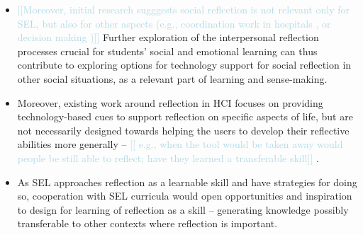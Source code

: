 \documentclass[prodmode,acmtochi]{acmsmall}
\newcommand{\todo}[1]{\textrm{\textrm{\textcolor{LightBlue}{[[#1]]} } } }
\begin{document}
\begin{itemize}
\item \todo{Moreover, initial research sugggests social reflection is not relevant only for SEL, but also for other aspects (e.g., coordination work in hospitals \cite{Prilla}, or decision making \cite{Dey})} Further exploration of the interpersonal reflection processes crucial for students' social and emotional learning can thus contribute to exploring options for technology support for social reflection in other social situations, as a relevant part of learning and sense-making.
\bigskip

\item Moreover, existing work around reflection in HCI focuses on providing technology-based cues to support reflection on specific aspects of life, but are not necessarily designed towards helping the users to develop their reflective abilities more generally -- \todo{ e.g., when the tool would be taken away would people be still able to reflect; have they learned a transferable skill}. 

\item As SEL approaches reflection as a learnable skill and have strategies for doing so, cooperation with SEL curricula would open opportunities and inspiration to design for learning of reflection as a skill -- generating knowledge possibly transferable to other contexts where reflection is important. 



\end{itemize}
\end{document}
